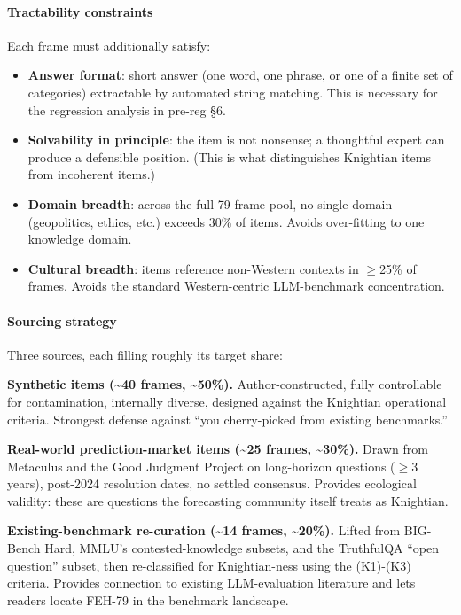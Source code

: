 \documentclass{article}
\providecommand{\tightlist}{\setlength{\itemsep}{0pt}\setlength{\parskip}{0pt}}
\begin{document}
\paragraph{Tractability constraints}\label{tractability-constraints}

Each frame must additionally satisfy:

\begin{itemize}
\tightlist
\item
  \textbf{Answer format}: short answer (one word, one phrase, or one of
  a finite set of categories) extractable by automated string matching.
  This is necessary for the regression analysis in pre-reg \S{}6.
\item
  \textbf{Solvability in principle}: the item is not nonsense; a
  thoughtful expert can produce a defensible position. (This is what
  distinguishes Knightian items from incoherent items.)
\item
  \textbf{Domain breadth}: across the full 79-frame pool, no single
  domain (geopolitics, ethics, etc.) exceeds 30\% of items. Avoids
  over-fitting to one knowledge domain.
\item
  \textbf{Cultural breadth}: items reference non-Western contexts in
  \ensuremath{\geq}25\% of frames. Avoids the standard Western-centric LLM-benchmark
  concentration.
\end{itemize}

\paragraph{Sourcing strategy}\label{sourcing-strategy}

Three sources, each filling roughly its target share:

\textbf{Synthetic items (\textasciitilde40 frames,
\textasciitilde50\%).} Author-constructed, fully controllable for
contamination, internally diverse, designed against the Knightian
operational criteria. Strongest defense against ``you cherry-picked from
existing benchmarks.''

\textbf{Real-world prediction-market items (\textasciitilde25 frames,
\textasciitilde30\%).} Drawn from Metaculus and the Good Judgment
Project on long-horizon questions (\ensuremath{\geq}3 years), post-2024 resolution
dates, no settled consensus. Provides ecological validity: these are
questions the forecasting community itself treats as Knightian.

\textbf{Existing-benchmark re-curation (\textasciitilde14 frames,
\textasciitilde20\%).} Lifted from BIG-Bench Hard, MMLU's
contested-knowledge subsets, and the TruthfulQA ``open question''
subset, then re-classified for Knightian-ness using the (K1)-(K3)
criteria. Provides connection to existing LLM-evaluation literature and
lets readers locate FEH-79 in the benchmark landscape.
\end{document}
